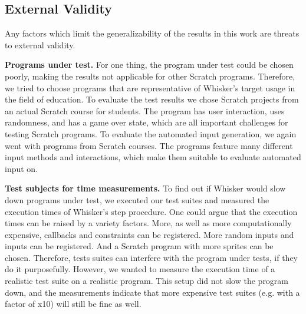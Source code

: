 \subsection{External Validity}

Any factors which limit the generalizability of the results in this work are threats to external validity.
\parspace

\textbf{Programs under test.} For one thing, the program under test could be chosen poorly,
making the results not applicable for other Scratch programs.
Therefore, we tried to choose programs that are representative of Whisker's target usage in the field of education.
To evaluate the test results we chose Scratch projects from an actual Scratch course for students.
The program has user interaction, uses randomness, and has a game over state,
which are all important challenges for testing Scratch programs.
To evaluate the automated input generation,
we again went with programs from Scratch courses.
The programs feature many different input methods and interactions,
which make them suitable to evaluate automated input on.
\parspace

\textbf{Test subjects for time measurements.}
To find out if Whisker would slow down programs under test,
we executed our test suites and measured the execution times of Whisker's step procedure.
One could argue that the execution times can be raised by a variety factors.
More, as well as more computationally expensive, callbacks and constraints can be registered.
More random inputs and inputs can be registered.
And a Scratch program with more sprites can be chosen.
Therefore, tests suites can interfere with the program under tests, if they do it purposefully.
However, we wanted to measure the execution time of a realistic test suite on a realistic program.
This setup did not slow the program down,
and the measurements indicate that more expensive test suites (e.g. with a factor of x10) will still be fine as well.
%
